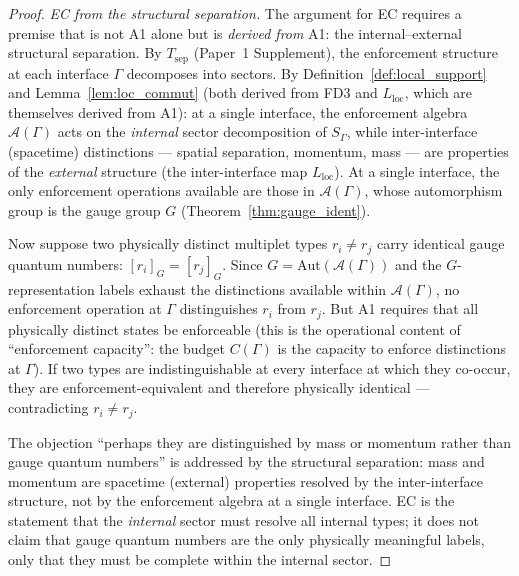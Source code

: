 \documentclass[11pt,a4paper]{article}
\theoremstyle{definition}
\begin{document}
\begin{proof}
\textit{EC from the structural separation.}\quad
The argument for EC requires a premise that is not A1 alone but is
\emph{derived from} A1: the internal--external structural separation.
By $T_{\mathrm{sep}}$ (Paper~1 Supplement), the enforcement structure
at each interface $\Gamma$ decomposes into sectors.  By
Definition~\ref{def:local_support} and Lemma~\ref{lem:loc_commut}
(both derived from FD3 and $L_{\mathrm{loc}}$, which are themselves
derived from A1): at a single interface, the enforcement algebra
$\mathcal{A}(\Gamma)$ acts on the \emph{internal} sector decomposition
of $S_\Gamma$, while inter-interface (spacetime) distinctions
--- spatial separation, momentum, mass --- are properties of the
\emph{external} structure (the inter-interface map
$L_{\mathrm{loc}}$).  At a single interface, the only enforcement
operations available are those in $\mathcal{A}(\Gamma)$, whose
automorphism group is the gauge group $G$
(Theorem~\ref{thm:gauge_ident}).

Now suppose two physically distinct multiplet types $r_i \ne r_j$
carry identical gauge quantum numbers: $[r_i]_G = [r_j]_G$.  Since
$G = \mathrm{Aut}(\mathcal{A}(\Gamma))$ and the $G$-representation
labels exhaust the distinctions available within
$\mathcal{A}(\Gamma)$, no enforcement operation at $\Gamma$
distinguishes $r_i$ from $r_j$.  But A1 requires that all physically
distinct states be enforceable (this is the operational content of
``enforcement capacity'': the budget $C(\Gamma)$ is the capacity to
enforce distinctions at $\Gamma$).  If two types are indistinguishable
at every interface at which they co-occur, they are enforcement-equivalent
and therefore physically identical --- contradicting $r_i \ne r_j$.

The objection ``perhaps they are distinguished by mass or momentum
rather than gauge quantum numbers'' is addressed by the structural
separation: mass and momentum are spacetime (external) properties
resolved by the inter-interface structure, not by the enforcement
algebra at a single interface.  EC is the statement that the
\emph{internal} sector must resolve all internal types; it does not
claim that gauge quantum numbers are the only physically meaningful
labels, only that they must be complete within the internal sector.


\end{proof}
\end{document}
